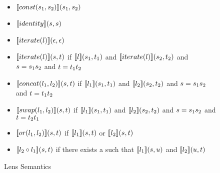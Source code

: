 \begin{figure}[b]
\centering
\begin{itemize}
\item $[ \! [const(s_1,s_2)] \! ](s_1,s_2)$

\item $[ \! [identity] \! ](s,s)$

\item $[ \! [iterate(l)] \! ](\epsilon,\epsilon)$

\item $[ \! [iterate(l)] \! ](s,t)$
if $[ \! [l] \! ](s_1,t_1)$
and $[ \! [iterate(l)] \! ](s_2,t_2)$
and $s=s_1s_2$
and $t=t_1t_2$

\item $[ \! [concat(l_1,l_2)] \! ](s,t)$
if $[ \! [l_1] \! ](s_1,t_1)$
and $[ \! [l_2] \! ](s_2,t_2)$
and $s=s_1s_2$
and $t=t_1t_2$

\item $[ \! [swap(l_1,l_2)] \! ](s,t)$
if $[ \! [l_1] \! ](s_1,t_1)$
and $[ \! [l_2] \! ](s_2,t_2)$
and $s=s_1s_2$
and $t=t_2t_1$

\item $[ \! [or(l_1,l_2)] \! ](s,t)$
if $[ \! [l_1] \! ](s,t)$
or $[ \! [l_2] \! ](s,t)$

\item $[ \! [l_2 \circ l_1] \! ](s,t)$
if there exists a \StringAltAlt{} such that
$[ \! [l_1] \! ](s,u)$
and $[ \! [l_2] \! ](u,t)$
\end{itemize}
\caption{Lens Semantics}
\label{fig:lens-semantics}
\end{figure}
